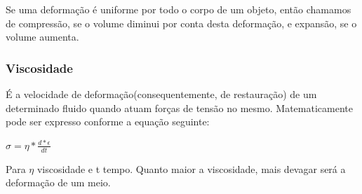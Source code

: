 	Se uma deformação é uniforme por todo o corpo de um objeto, então chamamos de compressão, se o volume diminui por conta desta deformação, e expansão, se o volume aumenta. 
	
	\subsubsection{Viscosidade}
	É a velocidade de deformação(consequentemente, de restauração) de
	um determinado fluido quando atuam forças de tensão no mesmo. Matematicamente
	pode ser expresso conforme a equação seguinte: 
	
	$
	\sigma = \eta * \frac{d*\epsilon}{dt}
	$
	
	Para $\eta$ viscosidade e t tempo. Quanto maior a viscosidade, mais devagar será a deformação de um meio.
	
